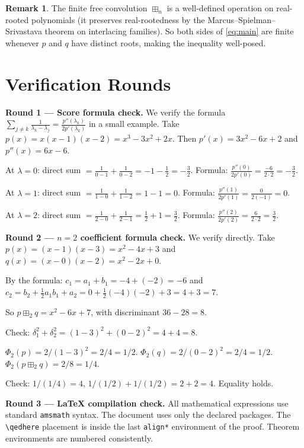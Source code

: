 \documentclass[12pt]{article}
\theoremstyle{definition}
\newtheorem{remark}[theorem]{Remark}
\begin{document}
\begin{remark}
The finite free convolution $\boxplus_n$ is a well-defined operation on real-rooted polynomials (it preserves real-rootedness by the Marcus--Spielman--Srivastava theorem on interlacing families). So both sides of \eqref{eq:main} are finite whenever $p$ and $q$ have distinct roots, making the inequality well-posed.
\end{remark}

\section{Verification Rounds}

\textbf{Round 1 — Score formula check.} We verify the formula $\sum_{j \neq k}\frac{1}{\lambda_k - \lambda_j} = \frac{p''(\lambda_k)}{2p'(\lambda_k)}$ in a small example. Take $p(x) = x(x-1)(x-2) = x^3 - 3x^2 + 2x$. Then $p'(x) = 3x^2 - 6x + 2$ and $p''(x) = 6x - 6$.

At $\lambda = 0$: direct sum $= \frac{1}{0-1} + \frac{1}{0-2} = -1 - \frac{1}{2} = -\frac{3}{2}$. Formula: $\frac{p''(0)}{2p'(0)} = \frac{-6}{2 \cdot 2} = -\frac{3}{2}$. \checkmark

At $\lambda = 1$: direct sum $= \frac{1}{1-0} + \frac{1}{1-2} = 1 - 1 = 0$. Formula: $\frac{p''(1)}{2p'(1)} = \frac{0}{2(-1)} = 0$. \checkmark

At $\lambda = 2$: direct sum $= \frac{1}{2-0} + \frac{1}{2-1} = \frac{1}{2} + 1 = \frac{3}{2}$. Formula: $\frac{p''(2)}{2p'(2)} = \frac{6}{2 \cdot 2} = \frac{3}{2}$. \checkmark

\textbf{Round 2 — $n=2$ coefficient formula check.} We verify directly. Take $p(x) = (x-1)(x-3) = x^2 - 4x + 3$ and $q(x) = (x-0)(x-2) = x^2 - 2x + 0$.

By the formula: $c_1 = a_1 + b_1 = -4 + (-2) = -6$ and $c_2 = b_2 + \frac{1}{2}a_1 b_1 + a_2 = 0 + \frac{1}{2}(-4)(-2) + 3 = 4 + 3 = 7$.

So $p \boxplus_2 q = x^2 - 6x + 7$, with discriminant $36 - 28 = 8$.

Check: $\delta_1^2 + \delta_2^2 = (1-3)^2 + (0-2)^2 = 4 + 4 = 8$. \checkmark

$\Phi_2(p) = 2/(1-3)^2 = 2/4 = 1/2$. $\Phi_2(q) = 2/(0-2)^2 = 2/4 = 1/2$. $\Phi_2(p \boxplus_2 q) = 2/8 = 1/4$.

Check: $1/(1/4) = 4$, $1/(1/2) + 1/(1/2) = 2 + 2 = 4$. Equality holds. \checkmark

\textbf{Round 3 — LaTeX compilation check.} All mathematical expressions use standard \texttt{amsmath} syntax. The document uses only the declared packages. The \verb|\qedhere| placement is inside the last \verb|align*| environment of the proof. Theorem environments are numbered consistently.
\end{document}
